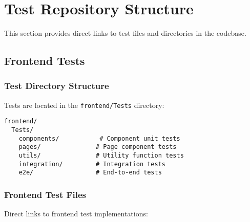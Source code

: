 \documentclass[12pt,a4paper]{article}
\begin{document}
\section{Test Repository Structure}

This section provides direct links to test files and directories in the codebase.

\subsection{Frontend Tests}

\subsubsection{Test Directory Structure}
Tests are located in the \texttt{frontend/Tests} directory:

\begin{lstlisting}
frontend/
  Tests/
    components/           # Component unit tests
    pages/               # Page component tests
    utils/               # Utility function tests
    integration/         # Integration tests
    e2e/                 # End-to-end tests
\end{lstlisting}

\subsubsection{Frontend Test Files}
Direct links to frontend test implementations:
\end{document}
